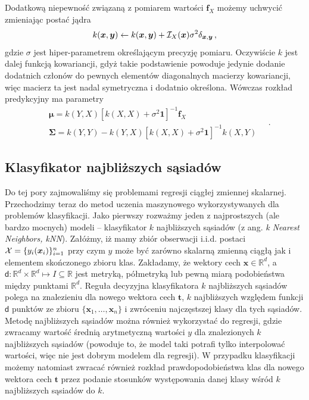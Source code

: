 \documentclass{myclass}
\numberwithin{equation}{subsection}
\begin{document}
Dodatkową niepewność związaną z pomiarem wartości \(\bm{f}_X\) możemy uchwycić zmieniając postać
jądra 
\begin{equation}
    k(\bm{x},\bm{y}) \leftarrow k(\bm{x},\bm{y}) + \mathcal{I}_X(\bm{x})\sigma^2\delta_{\bm{x},\bm{y}}\,,
\end{equation}
gdzie \(\sigma\) jest hiper-parametrem określającym precyzję pomiaru. Oczywiście \(k\) jest dalej
funkcją kowariancji, gdyż takie podstawienie powoduje jedynie dodanie dodatnich członów do pewnych
elementów diagonalnych macierzy kowariancji, więc macierz ta jest nadal symetryczna i dodatnio
określona. Wówczas rozkład predykcyjny ma parametry
\begin{equation}\boxed{
    \begin{split}
        &\bm{\mu} = k(Y,X)\left[k(X,X) + \sigma^2\bm{1}\right]^{-1}\bm{f}_X\\
        &\bm{\Sigma} = k(Y,Y) - k(Y,X)\left[k(X,X) + \sigma^2\bm{1}\right]^{-1}k(X,Y)
    \end{split}\quad.
}\end{equation}


\subsection{Klasyfikator najbliższych sąsiadów}

Do tej pory zajmowaliśmy się problemami regresji ciągłej zmiennej skalarnej. Przechodzimy teraz do
metod uczenia maszynowego wykorzystywanych dla problemów klasyfikacji. Jako pierwszy rozważmy jeden
z najprostszych (ale bardzo mocnych) modeli -- klasyfikator \(k\) najbliższych sąsiadów (z ang.
\textit{k Nearest Neighbors, kNN}). Załóżmy, iż mamy zbiór obserwacji i.i.d. postaci \(\mathcal{X} =
\{y_i(\bm{x}_i)\}_{i=1}^n\) przy czym \(y\) może być zarówno skalarną zmienną ciągłą jak i elementem
skończonego zbioru klas. Zakładamy, że wektory cech \(\bm{x} \in \mathbb{R}^d\), a \(\mathsf{d}:
\mathbb{R}^d \times \mathbb{R}^d \mapsto I \subseteq \mathbb{R}\) jest metryką, półmetryką lub pewną
miarą podobieństwa między punktami \(\mathbb{R}^d\). Reguła decyzyjna klasyfikatora \(k\)
najbliższych sąsiadów polega na znalezieniu dla nowego wektora cech \(\bm{t}\), \(k\) najbliższych
względem funkcji \(\mathsf{d}\) punktów ze zbioru \(\{\bm{x}_1,\ldots,\bm{x}_n\}\) i zwróceniu
najczęstszej klasy dla tych sąsiadów. Metodę najbliższych sąsiadów można również wykorzystać do
regresji, gdzie zwracamy wartość średnią arytmetyczną wartości \(y\) dla znalezionych \(k\)
najbliższych sąsiadów (powoduje to, że model taki potrafi tylko interpolować wartości, więc nie jest
dobrym modelem dla regresji). W przypadku klasyfikacji możemy natomiast zwracać również rozkład
prawdopodobieństwa klas dla nowego wektora cech \(\bm{t}\) przez podanie stosunków występowania
danej klasy wśród \(k\) najbliższych sąsiadów do \(k\).
\end{document}
